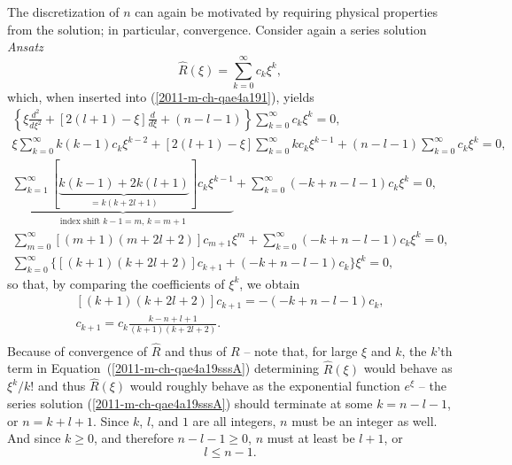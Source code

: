 The discretization of $n$ can again be motivated by requiring physical properties from
the solution; in particular, convergence.
Consider again a series solution {\it Ansatz}
\begin{equation}
\hat{R}(  \xi ) = \sum_{k=0}^\infty c_k\xi^k ,
\label{2011-m-ch-qae4a19sssA}
\end{equation}
which, when inserted into (\ref{2011-m-ch-qae4a191}),
yields
\begin{equation}
\begin{split}
\left\{
\xi  \frac{d^2}{   d    \xi^2}   + [ 2 (l+1)-\xi] \frac{   d   }{   d    \xi } + ( n-l-1  )
\right\}
\sum_{k=0}^\infty c_k\xi^k
=0,\\
%
\xi  \sum_{k=0}^\infty k(k-1) c_k\xi^{k-2}
+ [ 2 (l+1)-\xi] \sum_{k=0}^\infty k c_k\xi^{k-1}
+ ( n-l-1  )\sum_{k=0}^\infty c_k\xi^k
=0,\\
%
\underbrace{\sum_{k=1}^\infty \left[ \underbrace{k(k-1) + 2k(l+1)}_{=k(k+2l+1)}\right] c_k\xi^{k-1}}_{\text{index shift }k-1=m\text{, }k=m+1}
+
 \sum_{k=0}^\infty (-k + n-l-1  ) c_k\xi^k
=0,\\
%
\sum_{m=0}^\infty \left[ (m+1)(m+2l+2)\right] c_{m+1}\xi^m
+
 \sum_{k=0}^\infty (-k + n-l-1  ) c_k\xi^k
=0,\\
%
\sum_{k=0}^\infty
\Big\{
\left[ (k+1)(k+2l+2)\right] c_{k+1}
+
 (-k + n-l-1  ) c_k
\Big\}
\xi^k
=0,
\end{split}
\label{2011-m-ch-qae4a191ssA}
\end{equation}
so that, by comparing the coefficients of $\xi^k$, we obtain
\begin{equation}
\begin{split}
\left[ (k+1)(k+2l+2)\right] c_{k+1}
= -
 (-k + n-l-1  ) c_k  ,\\
c_{k+1}
=
c_k   \frac{k - n + l+ 1   }{(k+1) (k  + 2l + 2 )}  .\\
\end{split}
\label{2011-m-ch-qae4a191ssA5}
\end{equation}
Because of convergence of $\hat{R}$ and thus of $R$
--
note that, for large $\xi$ and $k$, the $k$'th term in
Equation~(\ref{2011-m-ch-qae4a19sssA}) determining $\hat{R}(  \xi )$
would behave as $\xi^k/k!$
and thus  $\hat{R}(  \xi )$ would roughly behave as the exponential function $e^\xi$
--
the series solution
(\ref{2011-m-ch-qae4a19sssA})
should terminate at some   $k =   n-l-1$,
or  $ n=  k+l+1$. Since $k$, $l$, and $1$ are all integers,
$n$ must be an integer as well.
And since $k\ge 0$,
and therefore $n-l-1 \ge 0$,
$n$ must at least be $l+1$, or
\begin{equation}
l\le n-1 .
\label{2011-m-ch-qae4a191ssA5hqz}
\end{equation}


